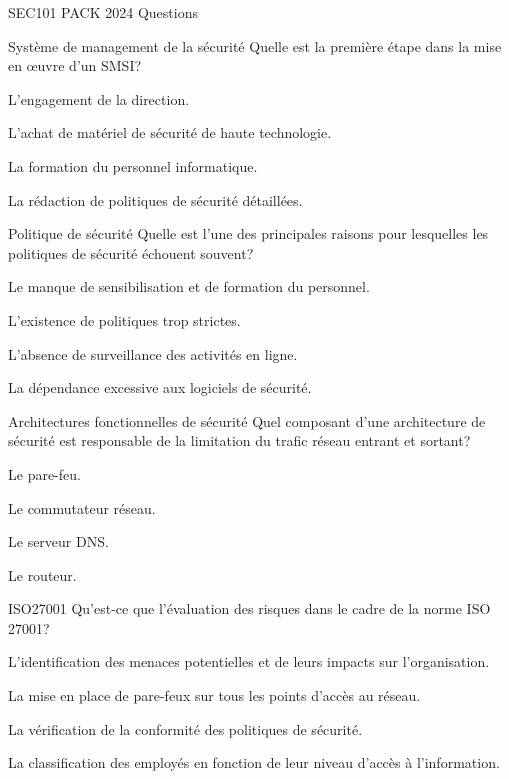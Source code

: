 \documentclass[12pt]{article}
\begin{document}
\begin{quiz}{SEC101 PACK 2024 Questions}
\begin{multi}[points=1]{Système de management de la sécurité}
Quelle est la première étape dans la mise en œuvre d'un SMSI?
\item* L'engagement de la direction.
\item L'achat de matériel de sécurité de haute technologie.
\item La formation du personnel informatique.
\item La rédaction de politiques de sécurité détaillées.
\end{multi}

\begin{multi}[points=1]{Politique de sécurité}
Quelle est l'une des principales raisons pour lesquelles les politiques de sécurité échouent souvent?
\item* Le manque de sensibilisation et de formation du personnel.
\item L'existence de politiques trop strictes.
\item L'absence de surveillance des activités en ligne.
\item La dépendance excessive aux logiciels de sécurité.
\end{multi}

\begin{multi}[points=1]{Architectures fonctionnelles de sécurité}
Quel composant d'une architecture de sécurité est responsable de la limitation du trafic réseau entrant et sortant?
\item* Le pare-feu.
\item Le commutateur réseau.
\item Le serveur DNS.
\item Le routeur.
\end{multi}

\begin{multi}[points=1]{ISO27001}
Qu'est-ce que l'évaluation des risques dans le cadre de la norme ISO 27001?
\item* L'identification des menaces potentielles et de leurs impacts sur l'organisation.
\item La mise en place de pare-feux sur tous les points d'accès au réseau.
\item La vérification de la conformité des politiques de sécurité.
\item La classification des employés en fonction de leur niveau d'accès à l'information.
\end{multi}


\end{quiz}
\end{document}
